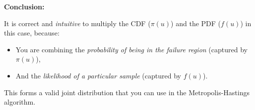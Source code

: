 \textbf{Conclusion:}

It is correct and \textit{intuitive} to multiply the CDF ($\pi(u)$) and the PDF ($f(u)$) in this case, because:
\begin{itemize}
    \item You are combining the \textit{probability of being in the failure region} (captured by $\pi(u)$),
    \item And the \textit{likelihood of a particular sample} (captured by $f(u)$).
\end{itemize}

This forms a valid joint distribution that you can use in the Metropolis-Hastings algorithm.



